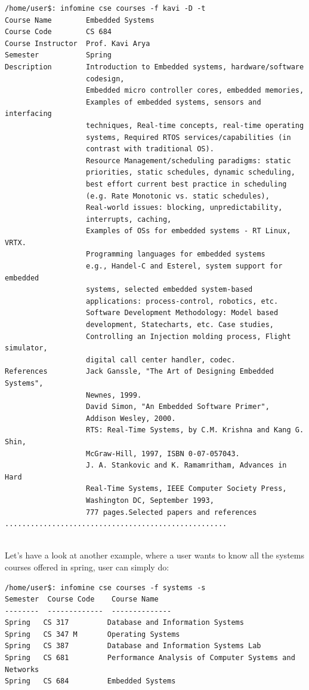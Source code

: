 \documentclass[12pt, a4paper]{article}
\begin{document}
\begin{verbatim}
/home/user$: infomine cse courses -f kavi -D -t
Course Name        Embedded Systems
Course Code        CS 684
Course Instructor  Prof. Kavi Arya
Semester           Spring
Description        Introduction to Embedded systems, hardware/software
                   codesign, 
                   Embedded micro controller cores, embedded memories, 
                   Examples of embedded systems, sensors and interfacing 
                   techniques, Real-time concepts, real-time operating 
                   systems, Required RTOS services/capabilities (in 
                   contrast with traditional OS).
                   Resource Management/scheduling paradigms: static 
                   priorities, static schedules, dynamic scheduling, 
                   best effort current best practice in scheduling 
                   (e.g. Rate Monotonic vs. static schedules), 
                   Real-world issues: blocking, unpredictability, 
                   interrupts, caching, 
                   Examples of OSs for embedded systems - RT Linux, VRTX.
                   Programming languages for embedded systems 
                   e.g., Handel-C and Esterel, system support for embedded 
                   systems, selected embedded system-based 
                   applications: process-control, robotics, etc. 
                   Software Development Methodology: Model based 
                   development, Statecharts, etc. Case studies, 
                   Controlling an Injection molding process, Flight simulator,
                   digital call center handler, codec.
References         Jack Ganssle, "The Art of Designing Embedded Systems", 
                   Newnes, 1999.
                   David Simon, "An Embedded Software Primer", 
                   Addison Wesley, 2000.
                   RTS: Real-Time Systems, by C.M. Krishna and Kang G. Shin, 
                   McGraw-Hill, 1997, ISBN 0-07-057043.
                   J. A. Stankovic and K. Ramamritham, Advances in Hard 
                   Real-Time Systems, IEEE Computer Society Press, 
                   Washington DC, September 1993, 
                   777 pages.Selected papers and references
....................................................
 
\end{verbatim}

Let's have a look at another example, where a user wants to know all the systems courses offered in spring, user can simply do:
\begin{verbatim}
/home/user$: infomine cse courses -f systems -s
Semester  Course Code    Course Name                                           
--------  -------------  --------------  
Spring   CS 317         Database and Information Systems                       
Spring   CS 347 M       Operating Systems                                      
Spring   CS 387         Database and Information Systems Lab                   
Spring   CS 681         Performance Analysis of Computer Systems and Networks  
Spring   CS 684         Embedded Systems
\end{verbatim}
\end{document}
